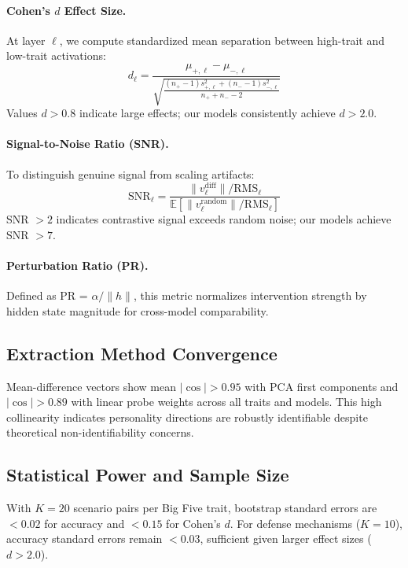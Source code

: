 \documentclass{article}
\begin{document}
\paragraph{Cohen's $d$ Effect Size.}
At layer $\ell$, we compute standardized mean separation between high-trait and low-trait activations:
\begin{equation}
d_\ell = \frac{\mu_{+,\ell} - \mu_{-,\ell}}{\sqrt{\frac{(n_+-1)s_{+,\ell}^2 + (n_--1)s_{-,\ell}^2}{n_+ + n_- - 2}}}
\end{equation}
Values $d > 0.8$ indicate large effects; our models consistently achieve $d > 2.0$.

\paragraph{Signal-to-Noise Ratio (SNR).}
To distinguish genuine signal from scaling artifacts:
\begin{equation}
\text{SNR}_\ell = \frac{\|v^{\text{diff}}_\ell\| / \text{RMS}_\ell}{\mathbb{E}[\|v^{\text{random}}_\ell\| / \text{RMS}_\ell]}
\end{equation}
SNR $> 2$ indicates contrastive signal exceeds random noise; our models achieve SNR $> 7$.

\paragraph{Perturbation Ratio (PR).}
Defined as PR = $\alpha / \|h\|$, this metric normalizes intervention strength by hidden state magnitude for cross-model comparability.

\subsection{Extraction Method Convergence}

Mean-difference vectors show mean $|\cos| > 0.95$ with PCA first components and $|\cos| > 0.89$ with linear probe weights across all traits and models. This high collinearity indicates personality directions are robustly identifiable despite theoretical non-identifiability concerns.

\subsection{Statistical Power and Sample Size}

With $K=20$ scenario pairs per Big Five trait, bootstrap standard errors are $<0.02$ for accuracy and $<0.15$ for Cohen's $d$. For defense mechanisms ($K=10$), accuracy standard errors remain $<0.03$, sufficient given larger effect sizes ($d > 2.0$).
\end{document}
